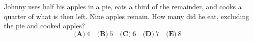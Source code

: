 Johnny uses half his apples in a pie, eats a third of the remainder, and cooks a quarter of what is then left. Nine apples remain. How many did he eat, excluding the pie and cooked apples?
\[\textbf{(A)}~4\quad\textbf{(B)}~5\quad\textbf{(C)}~6\quad\textbf{(D)}~7\quad\textbf{(E)}~8\]
